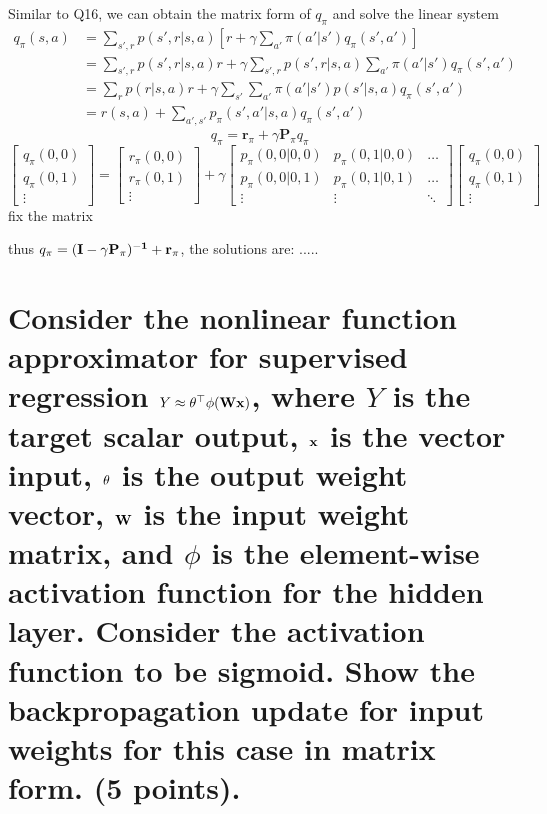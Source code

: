 \documentclass[twoside]{article}
\newcommand{\x}{{\bf x}}
\newcommand{\rpi}{\mathbf{r}_{\pi}}
\newcommand{\Ppi}{\mathbf{P}_{\pi}}
\begin{document}
\qquad Similar to Q16, we can obtain the matrix form of $ q_\pi $ and solve the linear system
\begin{align*}
	q_\pi(s,a) &= \sum_{s',r}p(s',r|s,a)\left[r+\gamma\sum_{a'}\pi(a'|s')q_\pi(s',a')\right] \\
	&=\sum_{s',r}p(s',r|s,a) r +  \gamma\sum_{s',r}p(s',r|s,a)\sum_{a'}\pi(a'|s')q_\pi(s',a')\\
	&=\sum_{r}p(r|s,a) r +  \gamma\sum_{s'}\sum_{a'}\pi(a'|s')p(s'|s,a)q_\pi(s',a')\\
	&=r(s,a) + \sum_{a', s'}p_\pi(s',a'|s,a)q_\pi(s',a')
\end{align*}
\begin{equation*}
q_\pi = \rpi + \gamma \Ppi q_\pi
\end{equation*}
\begin{equation*}
\begin{bmatrix}
q_{\pi}(0,0) \\
q_{\pi}(0,1) \\
\vdots
\end{bmatrix}
=
\begin{bmatrix}
r_{\pi}(0,0) \\
r_{\pi}(0,1) \\
\vdots
\end{bmatrix}
+ \gamma
\begin{bmatrix}
p_{\pi}(0,0|0,0) & p_{\pi}(0,1|0,0) & \dots \\
p_{\pi}(0,0|0,1) & p_{\pi}(0,1|0,1) & \dots \\
\vdots & \vdots & \ddots
\end{bmatrix}
\begin{bmatrix}
q_{\pi}(0,0) \\
q_{\pi}(0,1) \\
\vdots
\end{bmatrix}
\end{equation*}
fix the matrix

thus $ q_\pi = (\bf{I} - \gamma\Ppi)^{-1} + r_\pi $, the solutions are: .....



\section{\normalsize 
Consider the nonlinear function approximator for supervised regression $Y \approx {\bf \theta}^\top \phi({\bf W}\x)$, where $Y$ is the target scalar output, $\x$ is the vector input, ${\bf \theta}$ is the output weight vector, $\bf W$ is the input weight matrix, and $\phi$ is the element-wise activation function for the hidden layer. Consider the activation function to be sigmoid.
Show the backpropagation update for input weights for this case in matrix form.
 (5 points).
}
\end{document}

